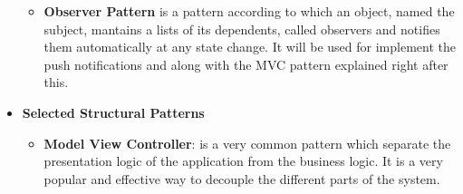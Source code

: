 \begin{itemize}
\begin{itemize}
            \item \textbf{Observer Pattern} is a pattern according to which an object, named the subject, mantains a lists of its dependents, called observers and notifies them automatically at any state change. It will be used for implement the push notifications and along with the MVC pattern explained right after this.
          \end{itemize}
    \item \textbf{Selected Structural Patterns}
            \begin{itemize}
                \item \textbf{Model View Controller}: is a very common pattern which separate the presentation logic of the application from the business logic. It is a very popular and effective way to decouple the different parts of the system.
            \end{itemize}
    
\end{itemize}



